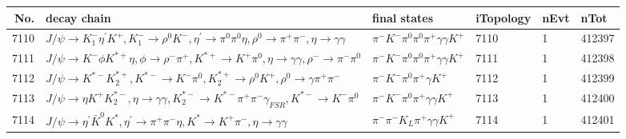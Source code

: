 \begin{table}[htbp] 
\begin{center}
\begin{small}
\begin{tabular}{rlllll}\hline\hline
 No. & decay chain & final states &  iTopology & nEvt & nTot \\\hline
7110&$J/\psi       \rightarrow K_{1}^{-}      \eta^{\prime} K^{+}          , K_{1}^{-}       \rightarrow \rho^{0}      K^{-}          , \eta^{\prime}  \rightarrow \pi^{0}        \pi^{0}        \eta          , \rho^{0}       \rightarrow \pi^{+}        \pi^{-}        , \eta           \rightarrow \gamma       \gamma       $&$\pi^{-}        K^{-}          \pi^{0}        \pi^{0}        \pi^{+}        \gamma       \gamma       K^{+}          $& 7110&    1&412397\\
7111&$J/\psi       \rightarrow K^{-}          \phi           K^{*+}         \eta          , \phi            \rightarrow \rho^{-}      \pi^{+}        , K^{*+}          \rightarrow K^{+}          \pi^{0}        , \eta           \rightarrow \gamma       \gamma       , \rho^{-}       \rightarrow \pi^{-}        \pi^{0}        $&$\pi^{-}        K^{-}          \pi^{0}        \pi^{0}        \pi^{+}        \gamma       \gamma       K^{+}          $& 7111&    1&412398\\
7112&$J/\psi       \rightarrow K^{*-}         K_2^{*+}       , K^{*-}          \rightarrow K^{-}          \pi^{0}        , K_2^{*+}        \rightarrow \rho^{0}      K^{+}          , \rho^{0}       \rightarrow \gamma       \pi^{+}        \pi^{-}        $&$\pi^{-}        K^{-}          \pi^{0}        \pi^{+}        \gamma       K^{+}          $& 7112&    1&412399\\
7113&$J/\psi       \rightarrow \eta          K^{+}          K_2^{*-}       , \eta           \rightarrow \gamma       \gamma       , K_2^{*-}        \rightarrow K^{*-}         \pi^{+}        \pi^{-}        \gamma_{FSR} , K^{*-}          \rightarrow K^{-}          \pi^{0}        $&$\pi^{-}        K^{-}          \pi^{0}        \pi^{+}        \gamma       \gamma       K^{+}          $& 7113&    1&412400\\
7114&$J/\psi       \rightarrow \eta^{\prime} \bar{K}^{0}   K^{*}          , \eta^{\prime}  \rightarrow \pi^{+}        \pi^{-}        \eta          , K^{*}           \rightarrow K^{+}          \pi^{-}        , \eta           \rightarrow \gamma       \gamma       $&$\pi^{-}        \pi^{-}        K_{L}          \pi^{+}        \gamma       \gamma       K^{+}          $& 7114&    1&412401\\

\end{tabular}
\end{small}
\end{center}
\end{table}
